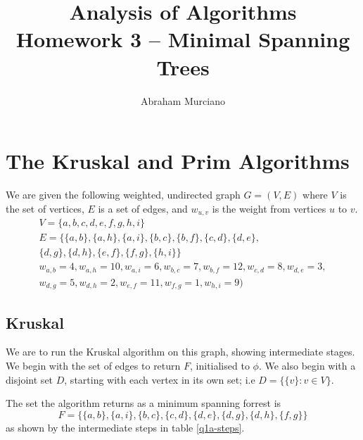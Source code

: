 \documentclass{article}
\title{Analysis of Algorithms \\
\medskip
\large Homework 3 -- Minimal Spanning Trees}
\author{Abraham Murciano}
\begin{document}
\maketitle

\section{The Kruskal and Prim Algorithms}

We are given the following weighted, undirected graph \(G = (V, E)\) where \(V\) is the set of vertices, \(E\) is a set of edges, and \(w_{u,v}\) is the weight from vertices \(u\) to \(v\).
\begin{gather*}
	V = \{a, b, c, d, e, f, g, h, i\} \\
	E = \{\{a, b\}, \{a, h\}, \{a, i\}, \{b, c\}, \{b, f\}, \{c, d\}, \{d, e\},\\ \{d, g\}, \{d, h\}, \{e, f\}, \{f, g\}, \{h, i\}\} \\
	w_{a, b} = 4, w_{a, h} = 10, w_{a, i} = 6, w_{b, c} = 7, w_{b, f} = 12, w_{c, d} = 8, w_{d, e} = 3, \\ w_{d, g} = 5, w_{d, h} = 2, w_{e, f} = 11, w_{f, g} = 1, w_{h, i} = 9)
\end{gather*}

\subsection{Kruskal}

We are to run the Kruskal algorithm on this graph, showing intermediate stages. We begin with the set of edges to return \(F\), initialised to \(\phi\). We also begin with a disjoint set \(D\), starting with each vertex in its own set; i.e \(D = \{\{v\} : v \in V\}\).

The set the algorithm returns as a minimum spanning forrest is
\begin{equation*}
	F = \{\{a, b\}, \{a, i\}, \{b, c\}, \{c, d\}, \{d, e\}, \{d, g\}, \{d, h\}, \{f, g\}\}
\end{equation*}
as shown by the intermediate steps in table \ref{q1a-steps}.
\end{document}
